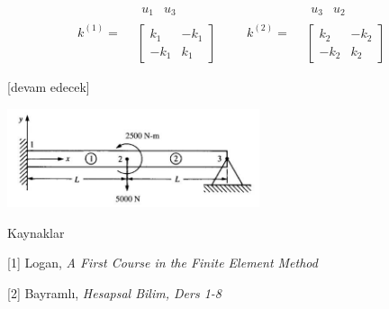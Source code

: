\documentclass[12pt,fleqn]{article}\usepackage{../../common}
\begin{document}
$$
k^{(1)} =
\begin{array}{cc} & \begin{array}{cc} u_1 & u_3 \end{array} \\ &
\left[
\begin{array}{cc}
k_1 & -k_1 \\ -k_1 & k_1
\end{array}
\right]
\end{array} 
\qquad
k^{(2)} =
\begin{array}{cc} & \begin{array}{cc} u_3 & u_2 \end{array} \\ &
\left[
\begin{array}{cc}
k_2 & -k_2 \\ -k_2 & k_2
\end{array}
\right]
\end{array}
$$





[devam edecek]


\includegraphics[width=20em]{phy_020_strs_06_01.jpg}


Kaynaklar

[1] Logan, {\em A First Course in the Finite Element Method}

[2] Bayramlı, {\em Hesapsal Bilim, Ders 1-8}
\end{document}
